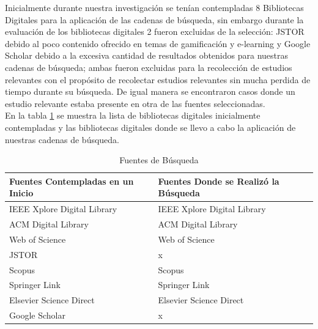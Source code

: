 \documentclass{report}
\begin{document}
            Inicialmente durante nuestra investigación se tenían contempladas 8 Bibliotecas Digitales para la aplicación de las cadenas de búsqueda, sin embargo durante la evaluación de los bibliotecas digitales 2 fueron excluidas de la selección: JSTOR debido al poco contenido ofrecido en temas de gamificación y e-learning y Google Scholar debido a la excesiva cantidad de resultados obtenidos para nuestras cadenas de búsqueda; ambas fueron excluidas para la recolección de estudios relevantes con el propósito de recolectar estudios relevantes sin mucha perdida de tiempo durante su búsqueda. De igual manera se encontraron casos donde un estudio relevante estaba presente en otra de las fuentes seleccionadas.\\ En la tabla \ref{table:libraries} se muestra la lista de bibliotecas digitales inicialmente contempladas y las bibliotecas digitales donde se llevo a cabo la aplicación de nuestras cadenas de búsqueda.
            \begin{table}
                \begin{center}
                    \caption{Fuentes de Búsqueda}
                    \label{table:libraries}
                    \begin{tabular}{| p{7cm} | p{7cm} |}
                        \toprule
                        \hline
                        \textbf {Fuentes Contempladas en un Inicio} &  \textbf{Fuentes Donde se Realizó la Búsqueda}\\
                        \hline
                        IEEE Xplore Digital Library & IEEE Xplore Digital Library\\
                        \hline
                        ACM Digital Library & ACM Digital Library\\
                        \hline
                        Web of Science & Web of Science\\
                        \hline
                        JSTOR & x\\
                        \hline
                        Scopus & Scopus\\
                        \hline
                        Springer Link & Springer Link\\
                        \hline
                        Elsevier Science Direct & Elsevier Science Direct\\
                        \hline
                        Google Scholar & x\\
                        \hline
                    \end{tabular}
                \end{center}
            \end{table}
    
\end{document}

